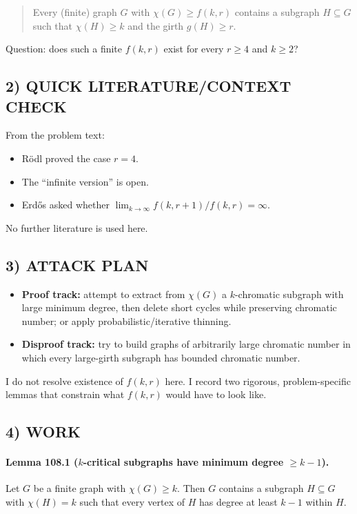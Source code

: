 \begin{quote}
Every (finite) graph $G$ with $\chi(G)\ge f(k,r)$ contains a subgraph $H\subseteq G$ such that $\chi(H)\ge k$ and the girth $g(H)\ge r$.
\end{quote}

Question: does such a finite $f(k,r)$ exist for every $r\ge4$ and $k\ge2$?

\subsection*{2) QUICK LITERATURE/CONTEXT CHECK}
From the problem text:
\begin{itemize}
\item R\"odl proved the case $r=4$.
\item The ``infinite version'' is open.
\item Erd\H{o}s asked whether $\lim_{k\to\infty} f(k,r+1)/f(k,r)=\infty$.
\end{itemize}
No further literature is used here.

\subsection*{3) ATTACK PLAN}
\begin{itemize}
\item \textbf{Proof track:} attempt to extract from $\chi(G)$ a $k$-chromatic subgraph with large minimum degree, then delete short cycles while preserving chromatic number; or apply probabilistic/iterative thinning.
\item \textbf{Disproof track:} try to build graphs of arbitrarily large chromatic number in which every large-girth subgraph has bounded chromatic number.
\end{itemize}
I do not resolve existence of $f(k,r)$ here.  I record two rigorous, problem-specific lemmas that constrain what $f(k,r)$ would have to look like.

\subsection*{4) WORK}
\paragraph{Lemma 108.1 ($k$-critical subgraphs have minimum degree $\ge k-1$).}
Let $G$ be a finite graph with $\chi(G)\ge k$.  Then $G$ contains a subgraph $H\subseteq G$ with $\chi(H)=k$ such that every vertex of $H$ has degree at least $k-1$ within $H$.

